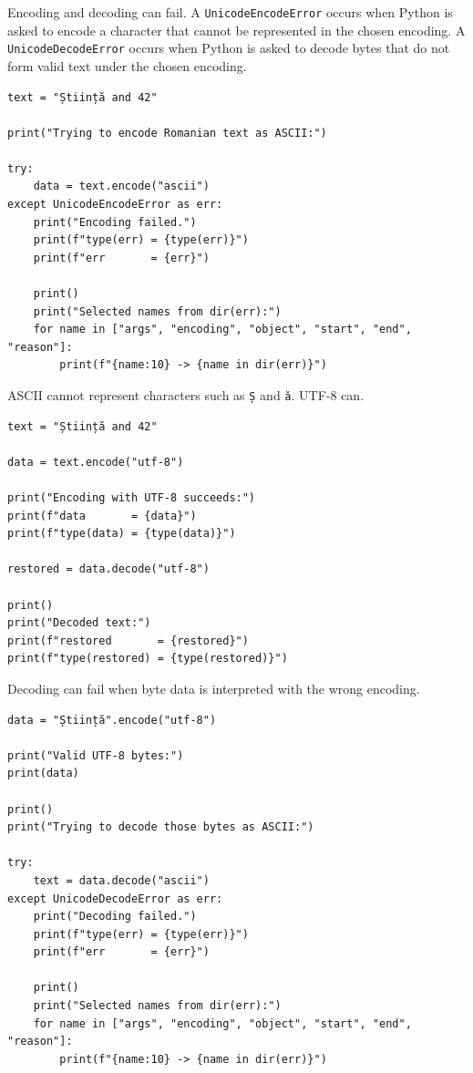 Encoding and decoding can fail. A \texttt{UnicodeEncodeError} occurs when Python is asked to encode a character that cannot be represented in the chosen encoding. A \texttt{UnicodeDecodeError} occurs when Python is asked to decode bytes that do not form valid text under the chosen encoding.

\begin{verbatim}
text = "Știință and 42"

print("Trying to encode Romanian text as ASCII:")

try:
    data = text.encode("ascii")
except UnicodeEncodeError as err:
    print("Encoding failed.")
    print(f"type(err) = {type(err)}")
    print(f"err       = {err}")

    print()
    print("Selected names from dir(err):")
    for name in ["args", "encoding", "object", "start", "end", "reason"]:
        print(f"{name:10} -> {name in dir(err)}")
\end{verbatim}

ASCII cannot represent characters such as \texttt{Ș} and \texttt{ă}. UTF-8 can.

\begin{verbatim}
text = "Știință and 42"

data = text.encode("utf-8")

print("Encoding with UTF-8 succeeds:")
print(f"data       = {data}")
print(f"type(data) = {type(data)}")

restored = data.decode("utf-8")

print()
print("Decoded text:")
print(f"restored       = {restored}")
print(f"type(restored) = {type(restored)}")
\end{verbatim}

Decoding can fail when byte data is interpreted with the wrong encoding.

\begin{verbatim}
data = "Știință".encode("utf-8")

print("Valid UTF-8 bytes:")
print(data)

print()
print("Trying to decode those bytes as ASCII:")

try:
    text = data.decode("ascii")
except UnicodeDecodeError as err:
    print("Decoding failed.")
    print(f"type(err) = {type(err)}")
    print(f"err       = {err}")

    print()
    print("Selected names from dir(err):")
    for name in ["args", "encoding", "object", "start", "end", "reason"]:
        print(f"{name:10} -> {name in dir(err)}")
\end{verbatim}

